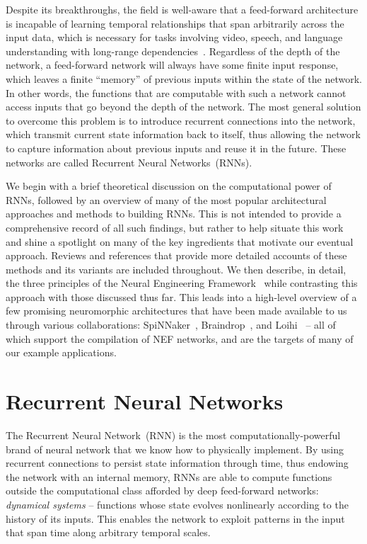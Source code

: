Despite its breakthroughs, the field is well-aware that a feed-forward architecture is incapable of learning temporal relationships that span arbitrarily across the input data, which is necessary for tasks involving video, speech, and language understanding with long-range dependencies~\citep{bengio1994learning}.
Regardless of the depth of the network, a feed-forward network will always have some finite input response, which leaves a finite ``memory'' of previous inputs within the state of the network.
In other words, the functions that are computable with such a network cannot access inputs that go beyond the depth of the network.
The most general solution to overcome this problem is to introduce recurrent connections into the network, which transmit current state information back to itself, thus allowing the network to capture information about previous inputs and reuse it in the future. 
These networks are called Recurrent Neural Networks~(RNNs).

We begin with a brief theoretical discussion on the computational power of RNNs, followed by an overview of many of the most popular architectural approaches and methods to building RNNs.
This is not intended to provide a comprehensive record of all such findings, but rather to help situate this work and shine a spotlight on many of the key ingredients that motivate our eventual approach.
Reviews and references that provide more detailed accounts of these methods and its variants are included throughout.
We then describe, in detail, the three principles of the Neural Engineering Framework~\citep[NEF;][]{eliasmith2003a} while contrasting this approach with those discussed thus far.
This leads into a high-level overview of a few promising neuromorphic architectures that have been made available to us through various collaborations: SpiNNaker~\citep{furber2014spinnaker}, Braindrop~\citep{braindrop2019}, and Loihi~\citep{davies2018loihi} -- all of which support the compilation of NEF networks, and are the targets of many of our example applications.

\section{Recurrent Neural Networks}

The Recurrent Neural Network~(RNN) is the most computationally-powerful brand of neural network that we know how to physically implement.
By using recurrent connections to persist state information through time, thus endowing the network with an internal memory, RNNs are able to compute functions outside the computational class afforded by deep feed-forward networks: \emph{dynamical systems} -- functions whose state evolves nonlinearly according to the history of its inputs.
This enables the network to exploit patterns in the input that span time along arbitrary temporal scales.

